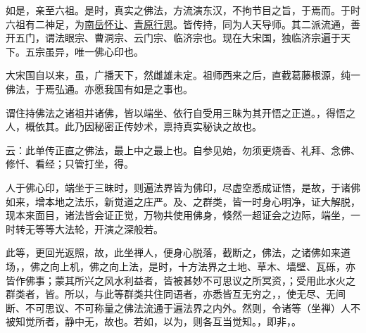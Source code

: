 如是，亲至六祖。是时，真实之佛法，方流演东汉，不拘节目之旨，于焉而。于时六祖有二神足，为\uline{南岳怀让}、\uline{青原行思}。皆传持，同为人天导师。其二派流通，善开五门，谓法眼宗、曹洞宗、云门宗、临济宗也。现在大宋国，独临济宗遍于天下。五宗虽异，唯一佛心印也。

大宋国自以来，虽，广播天下，然雌雄未定。祖师西来之后，直截葛藤根源，纯一佛法，于焉弘通。亦愿我国有如是之事也。

谓住持佛法之诸祖并诸佛，皆以端坐、依行自受用三昧为其开悟之正道。，得悟之人，概依其。此乃因秘密正传妙术，禀持真实秘诀之故也。

云：此单传正直之佛法，最上中之最上也。自参见始，勿须更烧香、礼拜、念佛、修忏、看经；只管打坐，得。

人于佛心印，端坐于三昧时，则遍法界皆为佛印，尽虚空悉成证悟，是故，于诸佛如来，增本地之法乐，新觉道之庄严。及、之群类，皆一时身心明净，证大解脱，现本来面目，诸法皆会证正觉，万物共使用佛身，倏然一超证会之边际，端坐，一时转无等等大法轮，开演之深般若。

此等，更回光返照，故，此坐禅人，便身心脱落，截断之，佛法，之诸佛如来道场，，佛之向上机，佛之向上法，是时，十方法界之土地、草木、墙壁、瓦砾，亦皆作佛事；蒙其所兴之风水利益者，皆被甚妙不可思议之所冥资，；受用此水火之群类者，皆。所以，与此等群类共住同语者，亦悉皆互无穷之，，使无尽、无间断、不可思议、不可称量之佛法流通于遍法界之内外。然则，令诸等（坐禅）人不被知觉所者，静中无，故也。若如，以为，则各互当觉知。，即非，。
